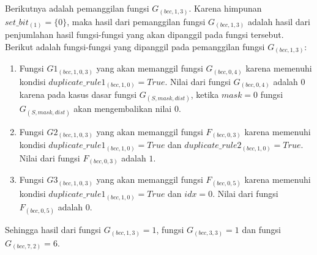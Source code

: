 Berikutnya adalah pemanggilan fungsi $ G_{(bcc, 1, 3)} $. Karena himpunan $ set\_bit_{(1)} = \{0\} $, maka hasil dari pemanggilan fungsi $ G_{(bcc, 1, 3)} $ adalah hasil dari penjumlahan hasil fungsi-fungsi yang akan dipanggil pada fungsi tersebut. Berikut adalah fungsi-fungsi yang dipanggil pada pemanggilan fungsi $ G_{(bcc, 1, 3)} $:
\begin{enumerate}
	\item Fungsi $ G1_{(bcc, 1, 0, 3)} $ yang akan memanggil fungsi $ G_{(bcc, 0, 4)} $ karena memenuhi kondisi $ duplicate\_rule1_{(bcc, 1, 0)} = True $. Nilai dari fungsi $ G_{(bcc, 0, 4)} $ adalah $ 0 $ karena pada kasus dasar fungsi $ G_{(S, mask, dist)} $, ketika $ mask=0 $ fungsi $ G_{(S, mask, dist)} $ akan mengembalikan nilai $ 0 $.
	
	\item Fungsi $ G2_{(bcc, 1, 0, 3)} $ yang akan memanggil fungsi $ F_{(bcc, 0, 3)} $ karena memenuhi kondisi $ duplicate\_rule1_{(bcc, 1, 0)} = True $ dan $ duplicate\_rule2_{(bcc, 1, 0)} = True $. Nilai dari fungsi $ F_{(bcc, 0, 3)} $ adalah $ 1 $.
	
	\item Fungsi $ G3_{(bcc, 1, 0, 3)} $ yang akan memanggil fungsi $ F_{(bcc, 0, 5)} $ karena memenuhi kondisi $ duplicate\_rule1_{(bcc, 1, 0)} = True $ dan $ idx = 0 $. Nilai dari fungsi $ F_{(bcc, 0, 5)} $ adalah $ 0 $.
\end{enumerate}

Sehingga hasil dari fungsi $ G_{(bcc, 1, 3)} =1$, fungsi $ G_{(bcc, 3, 3)} = 1$ dan fungsi $ G_{(bcc, 7, 2)} = 6$.